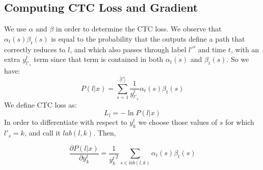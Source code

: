 \documentclass[12pt]{article}
\begin{document}
\subsection{Computing CTC Loss and Gradient}
We use $\alpha$ and $\beta$ in order to determine the CTC loss.  We observe that $\alpha_t(s)\beta_t(s)$ is equal to the probability that the outputs define a path that correctly reduces to $l$, and which also passes through label $l'^s$ and time $t$, with an extra $y^t_{l'_s}$ term since that term is contained in both $\alpha_t(s)$ and $\beta_t(s)$.  So we have:
\[P(l|x) =  \sum_{s = 1}^{|l'|} \frac{1}{y^t_{l'_s}} \alpha_t(s)\beta_t(s)\]
We define CTC loss as:
\[L_l = -\ln P(l|x)\]
In order to differentiate with respect to $y^t_k$ we choose those values of $s$ for which $l'_s = k$, and call it $lab(l, k)$.  Then,

\[\frac{\partial P(l|x)}{\partial y^t_k} = \frac{1}{{y^t_k}^2} \sum_{s \in lab(l, k)} \alpha_t(s)\beta_t(s)\]
 
\end{document}
